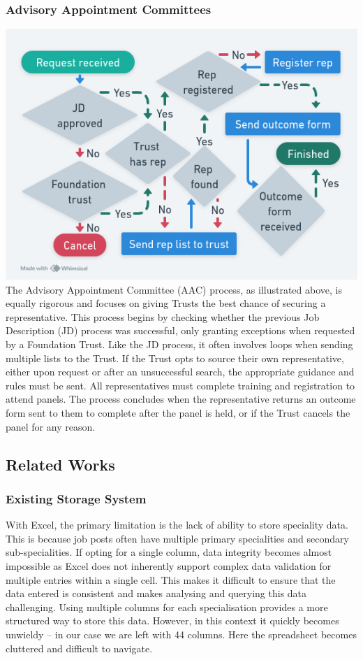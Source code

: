 \begin{multicols}{2}
\subsubsection{Advisory Appointment Committees}
    \noindent
\includegraphics[width=\linewidth]{images/aac.png}
The Advisory Appointment Committee (AAC) process, as illustrated above, is equally rigorous and focuses on giving Trusts the best chance of securing a representative. This process begins by checking whether the previous Job Description (JD) process was successful, only granting exceptions when requested by a Foundation Trust. Like the JD process, it often involves loops when sending multiple lists to the Trust. If the Trust opts to source their own representative, either upon request or after an unsuccessful search, the appropriate guidance and rules must be sent. All representatives must complete training and registration to attend panels. The process concludes when the representative returns an outcome form sent to them to complete after the panel is held, or if the Trust cancels the panel for any reason.
\subsection{Related Works}
\subsubsection{Existing Storage System}
With Excel, the primary limitation is the lack of ability to store speciality data. This is because job posts often have multiple primary specialities and secondary sub-specialities. If opting for a single column, data integrity becomes almost impossible as Excel does not inherently support complex data validation for multiple entries within a single cell. This makes it difficult to ensure that the data entered is consistent and makes analysing and querying this data challenging. Using multiple columns for each specialisation provides a more structured way to store this data. However, in this context it quickly becomes unwieldy – in our case we are left with 44 columns. Here the spreadsheet becomes cluttered and difficult to navigate.


\end{multicols}
